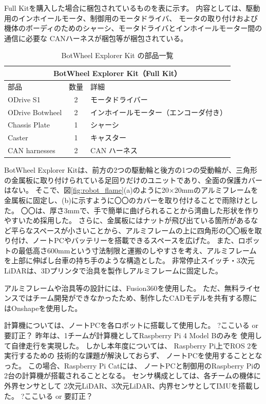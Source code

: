 \documentclass[twocolumn,9pt]{jsproceedings}
\begin{document}
Full Kitを購入した場合に梱包されているものを表に示す。
内容としては、駆動用のインホイールモータ、制御用のモータドライバ、
モータの取り付けおよび機体のボーディのためのシャーシ、モータドライバとインホイールモーター間の通信に必要な
CANハーネスが梱包等が梱包されている。
\begin{table}[h]
  \centering
  \begin{tabular}{|l|c|l|}
      \hline
      \multicolumn{3}{|c|}{\textbf{BotWheel Explorer Kit（Full Kit）}} \\
      \hline
      部品 & 数量 & 詳細 \\
      \hline
      ODrive S1 & 2 & モータドライバー \\
      ODrive Botwheel & 2 & インホイールモーター（エンコーダ付き） \\
      Chassis Plate & 1 & シャーシ \\
      Caster & 1 & キャスター \\
      CAN harnesses & 2 & CAN ハーネス \\
      \hline
  \end{tabular}
  \caption{BotWheel Explorer Kit の部品一覧}
  \label{tab:botwheel_kit}
\end{table}


BotWheel Explorer Kitは、前方の2つの駆動輪と後方の1つの受動輪が、三角形の金属板に取り付けられている足回りだけのユニットであり、全面の保護カバーはない。
そこで、図\ref{fig:robot_flame}(a)のように20×20mmのアルミフレームを金属板に固定し、(b)に示すように〇〇のカバーを取り付けることで雨除けとした。
〇〇は、厚さ3mmで、手で簡単に曲げられることから湾曲した形状を作りやすいため採用した。
さらに、金属板にはナットが飛び出ている箇所があるなど平らなスペースが小さいことから、アルミフレームの上に四角形の〇〇板を取り付け、ノートPCやバッテリーを搭載できるスペースを広げた。
また、ロボットの最低高さ600mmという寸法制限と運搬のしやすさを考え、アルミフレームを上部に伸ばし台車の持ち手のような構造とした。
非常停止スイッチ・3次元LiDARは、3Dプリンタで治具を製作しアルミフレームに固定した。

アルミフレームや治具等の設計には、Fusion360\cite{Fusion360}を使用した。
ただ、無料ライセンスではチーム開発ができなかったため、制作したCADモデルを共有する際にはOnshape\cite{Onshape}を使用した。


計算機については、ノートPCを各ロボットに搭載して使用した。
?ここいる or 要訂正？
昨年は、1チームが計算機としてRaspberry Pi 4 Model Bのみを
使用して自律走行を実現した\cite{池邉2022}。
しかし本年度については、
Raspberry Pi上でROS 2を実行するための
技術的な課題が解決しておらず、
ノートPCを使用することとなった。
この場合、Raspberry Pi Catには、
ノートPCと制御用のRaspberry Piの2台の計算機が搭載されることとなる。
センサ構成としては、各チームの機体に外界センサとして
2次元LiDAR、3次元LiDAR、内界センサとしてIMUを搭載した。
?ここいる or 要訂正？
\end{document}
